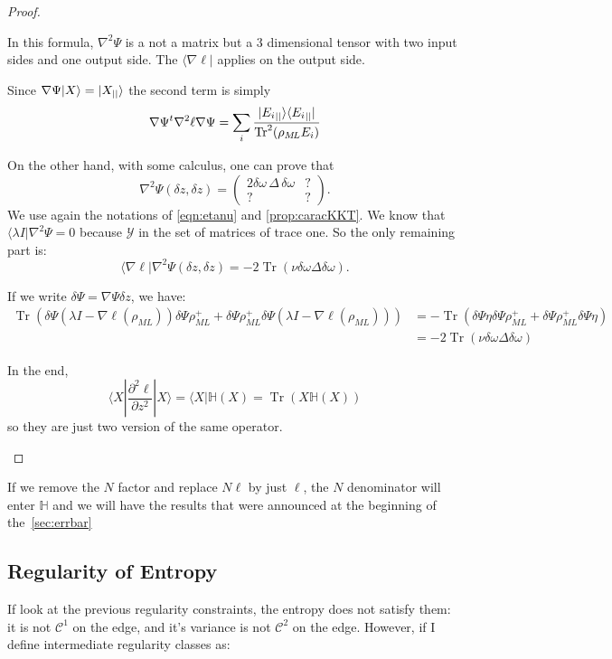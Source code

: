 \documentclass[10pt,a4paper]{report}
\theoremstyle{plain}
\theoremstyle{definition}
\theoremstyle{remark}
\newcommand{\ket}[1]{|#1\rangle}
\newcommand{\bra}[1]{\langle#1|}
\newcommand{\dparn}[3]{\frac{\partial^{#3} {#1}}{\partial{#2}^{#3}}}
\newcommand{\mat}[1]{\begin{pmatrix}#1\end{pmatrix}}
\DeclareMathOperator{\Tr}{Tr}
\newcommand{\class}[1]{{\mathscr{C}^{#1}}}
\newcommand{\ml}{_{M\!L}}
\begin{document}
\begin{proof}
\begin{itemize}
      In this formula, $\nabla^2 \Psi$ is a not a matrix but a 3 dimensional
      tensor with two input sides and one output side. The $\bra{\nabla \ell}$
      applies on the output side.

      Since $\nabla \Psi \ket X = \ket {X\pr}$ the second term is simply
      \[\nabla \Psi^t
        \nabla^2 \ell \nabla \Psi = \sum_i
        \frac{\ket{{E_i}\pr}\bra{{E_i}\pr}} {\Tr^2(\rho\ml E_i)} \]

      On the other hand, with some calculus, one
      can prove that
      \[ \nabla^2\Psi(\delta z, \delta z) = \mat{2\delta \omega\, \Delta\, \delta
          \omega & ? \\ ? & ?}.\]
      We use again the notations of \cref{eqn:etanu} and
      \cref{prop:caracKKT}. We know that $\bra {\lambda I} \nabla^2 \Psi = 0$
      because $\mathcal{Y}$ in the set of matrices of trace one. So the only
      remaining part is:
      \[\bra {\nabla \ell} \nabla^2\Psi(\delta z, \delta z) = -2\Tr(\nu \delta
        \omega \Delta \delta \omega). \]

      If we write $\delta \Psi = \nabla \Psi \delta z$, we have:
      \begin{align*}
        \Tr(\delta\Psi (\lambda I - \nabla \ell(\rho\ml))\delta\Psi\rho\ml^+ +
        \delta\Psi \rho\ml^+\delta\Psi(\lambda I - \nabla \ell(\rho\ml)))
        &= - \Tr(\delta\Psi \eta\delta\Psi\rho\ml^+ +
          \delta\Psi \rho\ml^+\delta\Psi\eta)\\
        &= -2\Tr(\nu \delta
        \omega \Delta \delta \omega)
      \end{align*}

      In the end,
      \[\bra X \dparn \ell z 2 \ket X = \bra X \mathbb H(X) = \Tr(X \mathbb H(X))\]
      so they are just two version of the same operator.
  \end{itemize}

\end{proof}


If we remove the $N$ factor and replace $N\ell$ by just $\ell$, the $N$
denominator will enter $\mathbb H$ and we will have the results that were announced at
the beginning of the~\cref{sec:errbar}

\subsection{Regularity of Entropy}\label{sec:regentropy}

If look at the previous regularity constraints, the entropy does not satisfy
them: it is not $\class 1$ on the edge, and it's variance is not $\class 2$ on
the edge. However, if I define intermediate regularity classes as:
\end{document}
